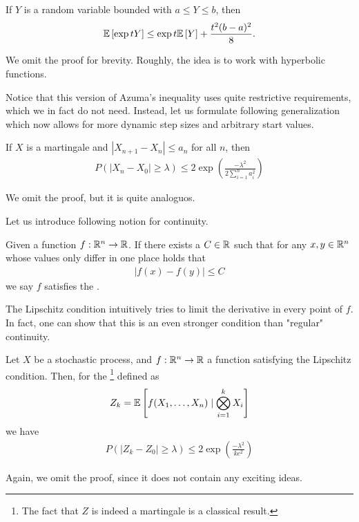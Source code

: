 \begin{lemma} \label{thm:hoeffding}
    If $Y$ is a random variable bounded with $a \leq Y \leq b$, then
    \begin{align}
        \mathbb{E}\left[\exp{tY}\right] \leq \exp{t\mathbb{E}\left[Y\right] + \frac{t^2(b-a)^2}{8}}.
    \end{align}
\end{lemma}
We omit the proof for brevity. Roughly, the idea is to work with hyperbolic functions.

Notice that this version of Azuma's inequality uses quite restrictive requirements,
which we in fact do not need.
Instead, let us formulate following generalization which now allows for more dynamic step sizes and arbitrary start values.
\begin{theorem}
    If $X$ is a martingale and $|X_{n+1} - X_n| \leq a_n$ for all $n$, then
    \begin{align}
        P(|X_n - X_0| \geq \lambda) \leq 2 \exp\left(\frac{-\lambda^2}{2 \sum_{i=1}^{n}a_i^2}\right)
    \end{align}
\end{theorem}
We omit the proof, but it is quite analoguos.

Let us introduce following notion for continuity.
\begin{definition}
    Given a function $f : \mathbb{R}^n \rightarrow \mathbb{R}$.
    If there exists a $C \in \mathbb{R}$ such that for any $x,y \in \mathbb{R}^n$ whose values only differ in one place holds that
    \begin{align}
        |f(x) - f(y)| \leq C
    \end{align}
    we say $f$ satisfies the .
\end{definition}
The Lipschitz condition intuitively tries to limit the derivative in every point of $f$.
In fact, one can show that this is an even stronger condition than "regular" continuity.
\begin{theorem} \label{thm:mcdiarmid}
    Let $X$ be a stochastic process, and $f : \mathbb{R}^n \rightarrow \mathbb{R}$ a function satisfying the Lipschitz condition.
    Then, for the \footnote{The fact that $Z$ is indeed a martingale is a classical result.} defined as
    \begin{align}
        Z_k = \mathbb{E}\left[f(X_1, \dots, X_n) \mid \bigotimes_{i=1}^k X_i\right]
    \end{align}
    we have
    \begin{align}
        P(|Z_k - Z_0| \geq \lambda) \leq 2\exp\left(\frac{-\lambda^2}{kc^2}\right)
    \end{align}
\end{theorem}
Again, we omit the proof, since it does not contain any exciting ideas.

